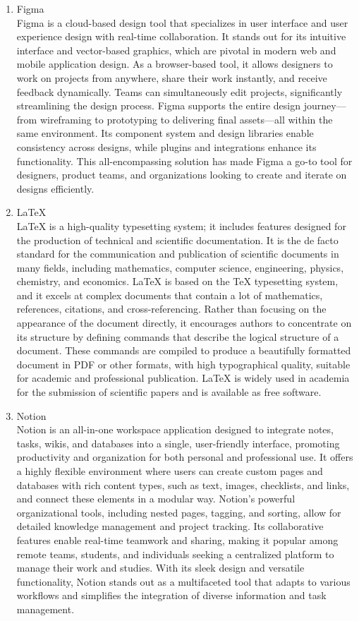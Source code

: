 \documentclass[conference]{IEEEtran}
\begin{document}
\begin{enumerate}[label=\arabic*.]
\item Figma\\
Figma is a cloud-based design tool that specializes in user interface and user experience design with real-time collaboration. It stands out for its intuitive interface and vector-based graphics, which are pivotal in modern web and mobile application design. As a browser-based tool, it allows designers to work on projects from anywhere, share their work instantly, and receive feedback dynamically. Teams can simultaneously edit projects, significantly streamlining the design process. Figma supports the entire design journey—from wireframing to prototyping to delivering final assets—all within the same environment. Its component system and design libraries enable consistency across designs, while plugins and integrations enhance its functionality. This all-encompassing solution has made Figma a go-to tool for designers, product teams, and organizations looking to create and iterate on designs efficiently.\\
\item LaTeX\\
LaTeX is a high-quality typesetting system; it includes features designed for the production of technical and scientific documentation. It is the de facto standard for the communication and publication of scientific documents in many fields, including mathematics, computer science, engineering, physics, chemistry, and economics. LaTeX is based on the TeX typesetting system, and it excels at complex documents that contain a lot of mathematics, references, citations, and cross-referencing. Rather than focusing on the appearance of the document directly, it encourages authors to concentrate on its structure by defining commands that describe the logical structure of a document. These commands are compiled to produce a beautifully formatted document in PDF or other formats, with high typographical quality, suitable for academic and professional publication. LaTeX is widely used in academia for the submission of scientific papers and is available as free software.\\
\item Notion\\
Notion is an all-in-one workspace application designed to integrate notes, tasks, wikis, and databases into a single, user-friendly interface, promoting productivity and organization for both personal and professional use. It offers a highly flexible environment where users can create custom pages and databases with rich content types, such as text, images, checklists, and links, and connect these elements in a modular way. Notion's powerful organizational tools, including nested pages, tagging, and sorting, allow for detailed knowledge management and project tracking. Its collaborative features enable real-time teamwork and sharing, making it popular among remote teams, students, and individuals seeking a centralized platform to manage their work and studies. With its sleek design and versatile functionality, Notion stands out as a multifaceted tool that adapts to various workflows and simplifies the integration of diverse information and task management.\\

\end{enumerate}
\end{document}
